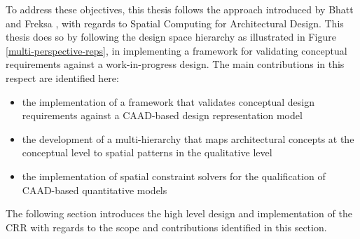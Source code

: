 \documentclass[12pt]{ucthesis}
\begin{document}
To address these objectives, this thesis follows the approach introduced by Bhatt and Freksa \cite{bhatt-spatial-computing}, with regards to Spatial Computing for Architectural Design. This thesis does so by following the design space hierarchy as illustrated in Figure \ref{multi-perspective-reps}, in implementing a framework for validating conceptual requirements against a work-in-progress design. The main contributions in this respect are identified here:
\begin{itemize}
\item the implementation of a framework that validates conceptual design requirements against a CAAD-based design representation model
\item the development of a multi-hierarchy that maps architectural concepts at the conceptual level to spatial patterns in the qualitative level
\item the implementation of spatial constraint solvers for the qualification of CAAD-based quantitative models
\end{itemize}

The following section introduces the high level design and implementation of the CRR with regards to the scope and contributions identified in this section. 


\end{document}
